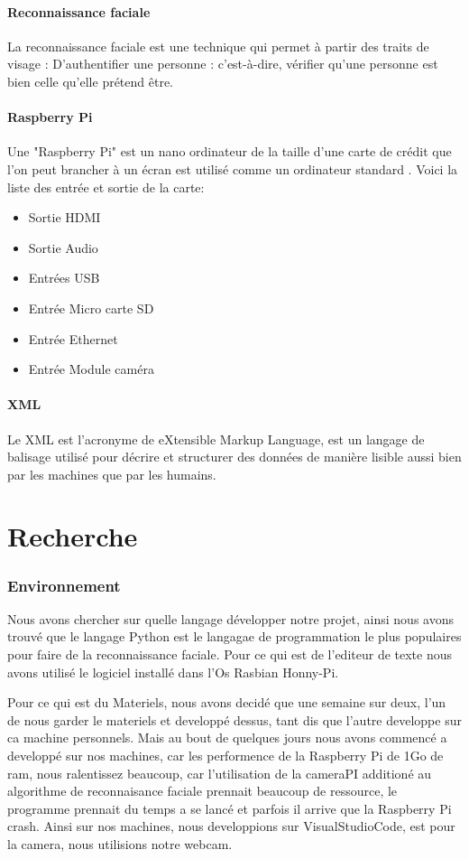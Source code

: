 \documentclass{article}
\begin{document}
\subsection{Reconnaissance faciale}
La reconnaissance faciale est une technique qui permet à partir des traits de visage : D'authentifier une personne : c'est-à-dire, vérifier qu'une personne est bien celle qu'elle prétend être.
\subsection{Raspberry Pi}
Une "Raspberry Pi" est un nano ordinateur de la taille d'une carte de crédit que l'on peut brancher à un écran est utilisé comme un ordinateur standard
. Voici la liste des entrée et sortie de la carte:

\begin{itemize}
    \item Sortie HDMI
    \item Sortie Audio
    \item Entrées USB
    \item Entrée Micro carte SD
    \item Entrée Ethernet
    \item Entrée Module caméra
\end{itemize}

\subsection{XML}
Le XML est l'acronyme de eXtensible Markup Language, est un langage de balisage utilisé pour décrire et structurer des données de manière lisible aussi
bien par les machines que par les humains.


\part{Recherche}

\section{Environnement}

Nous avons chercher sur quelle langage développer notre projet, ainsi nous avons trouvé que le langage Python est le langagae de programmation le plus populaires
pour faire de la reconnaissance faciale. Pour ce qui est de l'editeur de texte nous avons utilisé le logiciel installé
dans l'Os Rasbian Honny-Pi.

Pour ce qui est du Materiels, nous avons decidé que une semaine sur deux, l'un de nous garder le materiels et developpé dessus, tant dis que l'autre developpe
sur ca machine personnels.
Mais au bout de quelques jours nous avons commencé a developpé sur nos machines, car les performence de la Raspberry Pi de 1Go de ram, nous ralentissez beaucoup, car
l'utilisation de la cameraPI additioné au algorithme de reconnaisance faciale prennait beaucoup de ressource, le programme prennait du temps a se lancé et parfois il arrive que la Raspberry Pi crash.
Ainsi sur nos machines,  nous developpions sur VisualStudioCode, est pour la camera, nous utilisions notre webcam.
\end{document}
